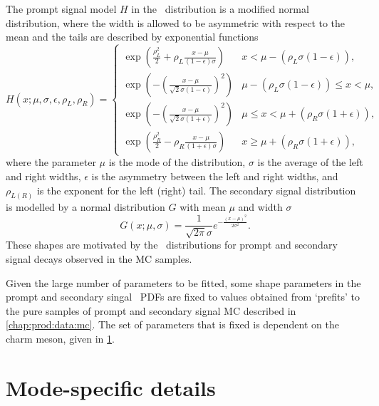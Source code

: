 The prompt signal model $H$ in the \lnipchisq\ distribution is a modified 
normal distribution, where the width is allowed to be asymmetric with respect 
to the mean and the tails are described by exponential functions
\begin{equation}
  H(x; \mu, \sigma, \epsilon, \rho_{L}, \rho_{R}) =
  \begin{cases}
    \exp\left(\frac{\rho_{L}^{2}}{2} + \rho_{L}\frac{x - \mu}{(1 - 
    \epsilon)\sigma}\right) & x < \mu - (\rho_{L}\sigma(1 - 
        \epsilon)), \\
    \exp\left(-\left(\frac{x - \mu}{\sqrt{2}\sigma(1 - 
    \epsilon)}\right)^{2}\right) & \mu - (\rho_{L}\sigma(1 - \epsilon)) 
          \leq x < \mu, \\
    \exp\left(-\left(\frac{x - \mu}{\sqrt{2}\sigma(1 + 
    \epsilon)}\right)^{2}\right) & \mu \leq x < \mu + (\rho_{R}\sigma(1 + 
          \epsilon)), \\
    \exp\left(\frac{\rho_{R}^{2}}{2} - \rho_{R}\frac{x - \mu}{(1 + 
    \epsilon)\sigma}\right) & x \geq \mu + (\rho_{R}\sigma(1 + 
        \epsilon)),
  \end{cases}
  \label{eqn:prod:fitting:ipchisq:signal_model}
\end{equation}
where the parameter $\mu$ is the mode of the distribution, $\sigma$ is the 
average of the left and right widths, $\epsilon$ is the asymmetry between the 
left and right widths, and $\rho_{L(R)}$ is the exponent for the left (right) 
tail.
The secondary signal distribution is modelled by a normal distribution $G$ with 
mean $\mu$ and width $\sigma$
\begin{equation}
  G(x; \mu, \sigma) = \frac{1}{\sqrt{2\pi}\sigma}
                      e^{-\frac{{(x - \mu)}^{2}}{2\sigma^{2}}}.
\end{equation}
These shapes are motivated by the \lnipchisq\ distributions for prompt and 
secondary signal decays observed in the \ac{MC} samples.

Given the large number of parameters to be fitted, some shape parameters in the 
prompt and secondary singal \lnipchisq\ \acp{PDF} are fixed to values obtained 
from `prefits' to the pure samples of prompt and secondary signal \ac{MC} 
described in \cref{chap:prod:data:mc}.
The set of parameters that is fixed is dependent on the charm meson, given in 
\cref{chap:prod:fitting:details}.

\section{Mode-specific details}
\label{chap:prod:fitting:details}

